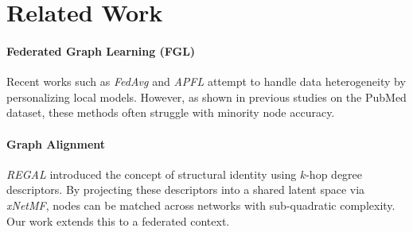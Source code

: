 \section{Related Work}
\paragraph{Federated Graph Learning (FGL)} Recent works such as \textit{FedAvg} and \textit{APFL} attempt to handle data heterogeneity by personalizing local models. However, as shown in previous studies on the PubMed dataset, these methods often struggle with minority node accuracy.

\paragraph{Graph Alignment} \textit{REGAL} introduced the concept of structural identity using $k$-hop degree descriptors. By projecting these descriptors into a shared latent space via \textit{xNetMF}, nodes can be matched across networks with sub-quadratic complexity. Our work extends this to a federated context.